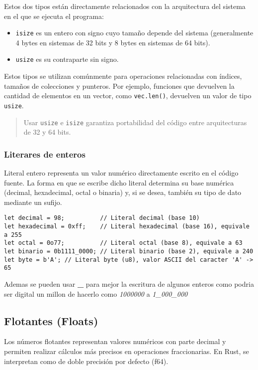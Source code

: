 \documentclass[12pt]{article}
\begin{document}
Estos dos tipos están directamente relacionados con la arquitectura del sistema en el que se ejecuta el programa:

\begin{itemize}
	\item \texttt{isize} es un entero con signo cuyo tamaño depende del sistema (generalmente 4 bytes en sistemas de 32 bits y 8 bytes en sistemas de 64 bits).
	\item \texttt{usize} es su contraparte sin signo.
\end{itemize}

Estos tipos se utilizan comúnmente para operaciones relacionadas con índices, tamaños de colecciones y punteros. Por ejemplo, funciones que devuelven la cantidad de elementos en un vector, como \texttt{vec.len()}, devuelven un valor de tipo \texttt{usize}.

\begin{quote}
	Usar \texttt{usize} e \texttt{isize} garantiza portabilidad del código entre arquitecturas de 32 y 64 bits.
\end{quote}


	\subsubsection{Literares de enteros}
	 Literal entero representa un valor numérico directamente escrito en el código fuente. La forma en que se escribe dicho literal determina su base numérica (decimal, hexadecimal, octal o binaria) y, si se desea, también su tipo de dato mediante un sufijo.


\begin{lstlisting}[style=ruststyle]
let decimal = 98;          // Literal decimal (base 10)
let hexadecimal = 0xff;    // Literal hexadecimal (base 16), equivale a 255
let octal = 0o77;          // Literal octal (base 8), equivale a 63
let binario = 0b1111_0000; // Literal binario (base 2), equivale a 240
let byte = b'A'; // Literal byte (u8), valor ASCII del caracter 'A' -> 65
\end{lstlisting}

	Ademas se pueden usar \textbf{\_} para mejor la escritura de algunos enteros como podria
	ser digital un millon de hacerlo como \textit{1000000} a \textit{1\_000\_000}

	\subsection{Flotantes (Floats)}
	Los números flotantes representan valores numéricos con parte decimal y permiten realizar cálculos más precisos en operaciones fraccionarias. En Rust, se interpretan como de doble precisión por defecto (f64).
\end{document}
